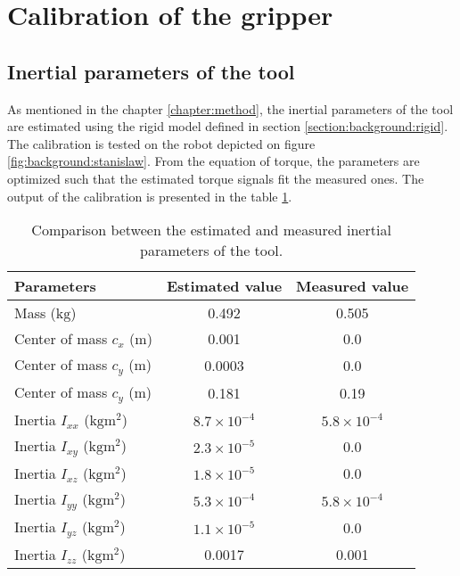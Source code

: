 \documentclass[/home/francois/latex/report/main.tex]{subfiles}
\begin{document}
\section{Calibration of the gripper}
\label{section:results:calibration}

\subsection{Inertial parameters of the tool}

As mentioned in the chapter \ref{chapter:method}, the inertial parameters of the tool are estimated using the rigid model defined in section \ref{section:background:rigid}. The calibration is tested on the robot depicted on figure \ref{fig:background:stanislaw}. From the equation of torque, the parameters are optimized such that the estimated torque signals fit the measured ones. The output of the calibration is presented in the table \ref{tab:results:calibration-tool}.

\begin{table}[h]
  \begin{center}
    \renewcommand{\arraystretch}{1.2} %
    \begin{tabular}{l|c|c} %
      \textbf{Parameters} & \textbf{Estimated value} & \textbf{Measured value}\\
      \hline
      Mass ($\si{\kilogram}$)  & 0.492 & 0.505 \\
      \hline
      Center of mass $c_x$ ($\si{\meter}$)  & 0.001 & 0.0 \\
      \hline
      Center of mass $c_y$ ($\si{\meter}$)  & 0.0003 & 0.0 \\
      \hline
      Center of mass $c_y$ ($\si{\meter}$)  & 0.181 & 0.19 \\
      \hline
      Inertia $I_{xx}$ ($\si{\kilogram\meter\squared}$)  & $8.7 \times 10^{-4}$ & $5.8 \times 10^{-4}$ \\
      \hline
      Inertia $I_{xy}$ ($\si{\kilogram\meter\squared}$)  & $2.3 \times 10^{-5}$ & 0.0 \\
      \hline
      Inertia $I_{xz}$ ($\si{\kilogram\meter\squared}$)  & $1.8 \times 10^{-5}$ & 0.0 \\
      \hline
      Inertia $I_{yy}$ ($\si{\kilogram\meter\squared}$)  & $5.3 \times 10^{-4}$ & $5.8 \times 10^{-4}$ \\
      \hline
      Inertia $I_{yz}$ ($\si{\kilogram\meter\squared}$)  & $1.1 \times 10^{-5}$ & 0.0 \\
      \hline
      Inertia $I_{zz}$ ($\si{\kilogram\meter\squared}$)  & 0.0017 & 0.001 \\
      \hline
    \end{tabular}
  \end{center}
  \caption{Comparison between the estimated and measured inertial parameters of the tool.\label{tab:results:calibration-tool}}
\end{table}
\end{document}
